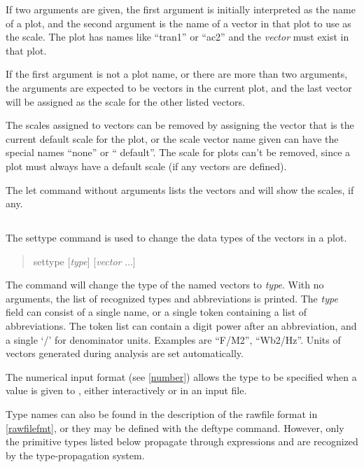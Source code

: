 If two arguments are given, the first argument is initially
interpreted as the name of a plot, and the second argument is the name
of a vector in that plot to use as the scale.  The plot has names like
``{\vt tran1}'' or ``{\vt ac2}'' and the {\it vector} must exist in
that plot.

If the first argument is not a plot name, or there are more than two
arguments, the arguments are expected to be vectors in the current
plot, and the last vector will be assigned as the scale for the other
listed vectors.

The scales assigned to vectors can be removed by assigning the vector
that is the current default scale for the plot, or the scale vector
name given can have the special names ``{\vt none}'' or ``{\vt
default}''.  The scale for plots can't be removed, since a plot must
always have a default scale (if any vectors are defined).

The {\cb let} command without arguments lists the vectors and will
show the scales, if any.

\subsection{}
\label{settype}


The {\cb settype} command is used to change the data types
of the vectors in a plot.
\begin{quote}\vt
settype [{\it type\/}] [{\it vector} ...]
\end{quote}
The command will change the type of the named vectors to {\it type\/}. 
With no arguments, the list of recognized types and abbreviations is
printed.  The {\it type} field can consist of a single name, or a
single token containing a list of abbreviations.  The token list can
contain a digit power after an abbreviation, and a single `/' for
denominator units.  Examples are ``F/M2'', ``Wb2/Hz''.  Units of
vectors generated during analysis are set automatically.

The {\WRspice} numerical input format (see \ref{number}) allows the
type to be specified when a value is given to {\WRspice}, either
interactively or in an input file.

Type names can also be found in the description of the rawfile format
in \ref{rawfilefmt}, or they may be defined with the {\cb deftype}
command.  However, only the primitive types listed below propagate
through expressions and are recognized by the {\WRspice}
type-propagation system.

